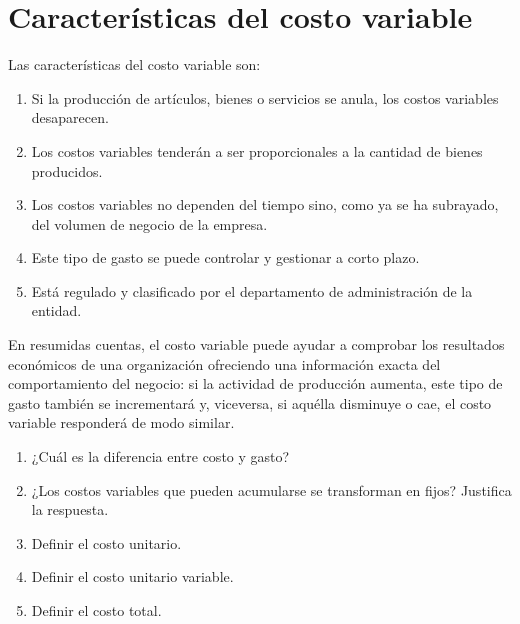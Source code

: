 \documentclass[../main]{subfiles}
\begin{document}
\section{Características del costo variable}
\begin{center}
\end{center}
Las características del costo variable son:
\begin{enumerate}
  \item Si la producción de artículos, bienes o servicios se anula,
    los costos variables desaparecen.
  \item Los costos variables tenderán a ser proporcionales
    a la cantidad de bienes producidos.
  \item Los costos variables no dependen del tiempo sino, como ya se
    ha subrayado, del volumen de negocio de la empresa.
  \item Este tipo de gasto se puede controlar y gestionar a corto plazo.
  \item Está regulado y clasificado por el departamento de
    administración de la entidad.
\end{enumerate}
En resumidas cuentas, el costo variable puede ayudar a comprobar los
resultados económicos de una organización ofreciendo una información
exacta del comportamiento del negocio: si la actividad de producción
aumenta, este tipo de gasto también se incrementará y, viceversa, si
aquélla disminuye o cae, el costo variable responderá de modo similar.
\begin{enumerate}
  \item ¿Cuál es la diferencia entre costo y gasto?
  \item ¿Los costos variables que pueden acumularse se transforman en
    fijos? Justifica la respuesta.
  \item Definir el costo unitario.
  \item Definir el costo unitario variable.
  \item Definir el costo total.
\end{enumerate}
\end{document}
